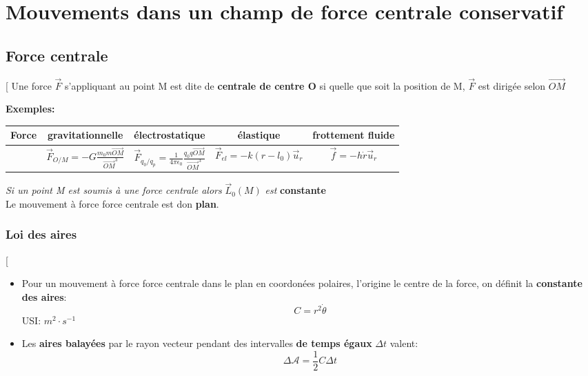 \documentclass[12pt,hidelinks]{article}
\begin{document}
\newpage
\section{Mouvements dans un champ de force centrale conservatif}
\vspace{3cm}

    \subsection{Force centrale}
        \begin{DashedDefinition}{}[
            Une force $\vec F$ s'appliquant au point M est dite de \textbf{centrale de centre O} si quelle que soit la position de M, $\vec F$ est dirigée selon $\overrightarrow{OM}$
        \end{DashedDefinition}
        \textbf{Exemples:}
        \begin{table}[h!]
            \centering
            \begin{tabular}{c|c|c|c|c}
            Force & gravitationnelle & électrostatique & élastique & frottement fluide \\\hline
            & $\vec F_{O/M}= -G \frac{m_0 m\overrightarrow{OM}}{\overrightarrow{OM}^3}$ & $\vec F_{q_0/q_p}= \frac{1}{4 \pi \epsilon_0} \frac{q_0 q\overrightarrow{OM}}{\overrightarrow{OM}^3}$ & $\vec F_{el}=-k(r-l_0)\vec u_r$ & $\vec f = -h \dot{r} \vec u_r$
            \end{tabular}
        \end{table}
        \textit{Si un point M est soumis à une force centrale alors} $\vec L_0(M)$ \textit{est} \textbf{constante} \\
        Le mouvement à force force centrale est don \textbf{plan}.

        \subsubsection{Loi des aires}
            \begin{DashedDefinition}{}[
                \begin{itemize}
                    \item Pour un mouvement à force force centrale dans le plan en coordonées polaires, l'origine le centre de la force, on définit la \textbf{constante des aires}:
                    \[C=r^2 \dot{\theta}\]
                    USI: $m^2 \cdot s^{-1}$
                    \item Les \textbf{aires balayées} par le rayon vecteur pendant des intervalles \textbf{de temps égaux} $\Delta t$ valent:
                    \[\Delta \mathcal{A} = \frac{1}{2} C \Delta t\]
                \end{itemize}
            \end{DashedDefinition}
            
\end{document}
